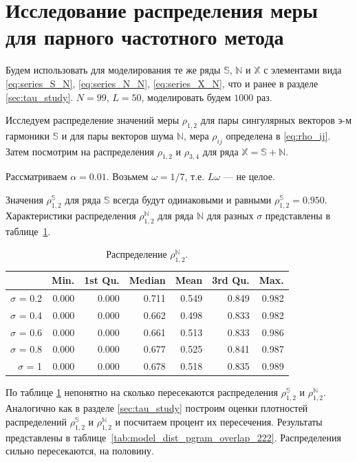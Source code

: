 \documentclass[specialist,
               substylefile = spbu.rtx,
               subf,href,colorlinks=true, 12pt]{disser}
\begin{document}
\section{Исследование распределения меры для парного частотного метода}
\label{sec:per_study}

Будем использовать для моделирования те же ряды $\mathbb{S}$, $\mathbb{N}$ и $\mathbb{X}$ с элементами вида
\eqref{eq:series_S_N}, \eqref{eq:series_N_N}, \eqref{eq:series_X_N}, что и ранее в разделе \ref{sec:tau_study}.
$N = 99$, $L = 50$, моделировать будем $1000$ раз.

Исследуем распределение значений  меры $\rho_{1,2}$ для пары сингулярных векторов э-м гармоники $\mathbb{S}$ и для пары векторов шума $\mathbb{N}$, мера $\rho_{ij}$ определена в \eqref{eq:rho_ij}. Затем посмотрим на распределения  $\rho_{1,2}$ и  $\rho_{3,4}$ для ряда $\mathbb{X} = \mathbb{S} + \mathbb{N}$.

Рассматриваем $\alpha = 0.01$. Возьмем $\omega = 1/7$, т.е. $L\omega$ --- не целое.

Значения $\rho^{\mathbb{S}}_{1,2}$  для ряда $\mathbb{S}$ всегда будут одинаковыми и равными  $\rho^{\mathbb{S}}_{1,2} = 0.950$. Характеристики распределения $\rho^{\mathbb{N}}_{1,2}$ для ряда $\mathbb{N}$ для разных $\sigma$ представлены в таблице~\ref{tab:model_dist_pgram_sig2}.

\begin{table}[hhh!]
\caption{Распределение $\rho^{\mathbb{N}}_{1,2}$.}
\centering
\begin{tabular}{rrrrrrr}
  \hline
 & Min. & 1st Qu. & Median & Mean & 3rd Qu. & Max. \\
  \hline
$\sigma$ = 0.2 & 0.000 & 0.000 & 0.711 & 0.549 & 0.849 & 0.982 \\ 
  $\sigma$ = 0.4 & 0.000 & 0.000 & 0.662 & 0.498 & 0.833 & 0.982 \\ 
  $\sigma$ = 0.6 & 0.000 & 0.000 & 0.661 & 0.513 & 0.833 & 0.986 \\ 
  $\sigma$ = 0.8 & 0.000 & 0.000 & 0.677 & 0.525 & 0.841 & 0.987 \\ 
  $\sigma$ = 1 & 0.000 & 0.000 & 0.678 & 0.518 & 0.835 & 0.989 \\ 
   \hline
\end{tabular}
\label{tab:model_dist_pgram_sig2}
\end{table}

По таблице \ref{tab:model_dist_pgram_sig2} непонятно на сколько пересекаются распределения $\rho^{\mathbb{S}}_{1,2}$ и $\rho^{\mathbb{N}}_{1,2}$.
Аналогично как в разделе \ref{sec:tau_study} построим оценки плотностей распределений $\rho^{\mathbb{S}}_{1,2}$ и  $\rho^{\mathbb{N}}_{1,2}$ и посчитаем процент их пересечения.
Результаты представлены в таблице~\ref{tab:model_dist_pgram_overlap_222}. Распределения сильно пересекаются, на половину.
\end{document}
